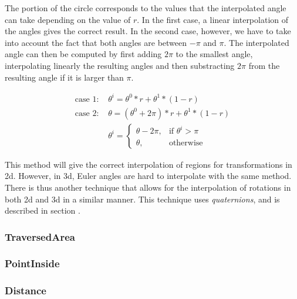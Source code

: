 
		The  portion of the circle corresponds to the values that the interpolated angle can take depending on the value of \( r \). In the first case, a linear interpolation of the angles gives the correct result. In the second case, however, we have to take into account the fact that  both angles are between \( -\pi \) and \( \pi \). The interpolated angle can then be computed by first adding \( 2\pi \) to the smallest angle, interpolating linearly the resulting angles and then substracting \( 2\pi \) from the resulting angle if it is larger than \( \pi \).

		\begin{equation}
		\begin{split}
			\text{case } 1: \, & \theta^i = \theta^0 * r + \theta^1 * (1-r) \\
			\text{case } 2: \, & \theta = (\theta^0 + 2\pi) * r + \theta^1 * (1-r) \\
						   	    & \theta^i = 
									\begin{cases}
										\theta - 2\pi, & \text{if } \theta^i > \pi\\
										\theta,         & \text{otherwise}
									\end{cases}
		\end{split}
		\end{equation}

		This method will give the correct interpolation of regions for transformations in 2d. However, in 3d, Euler angles are hard to interpolate with the same method. There is thus another technique that allows for the interpolation of rotations in both 2d and 3d in a similar manner. This technique uses \textit{quaternions}, and is described in section .
		
		\subsubsection{TraversedArea}
		
		
		\subsubsection{PointInside}
		
		
		\subsubsection{Distance}
		

